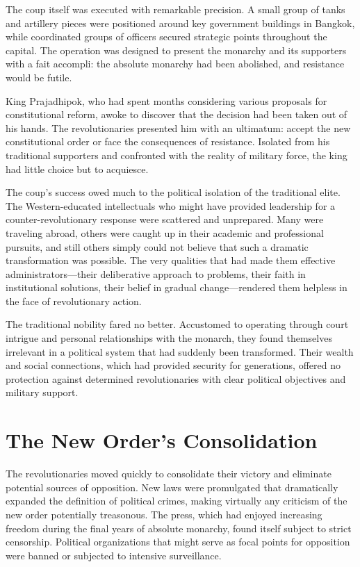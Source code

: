 \documentclass[
  Letterpaper,
]{scrbook}
\begin{document}
The coup itself was executed with remarkable precision. A small group of
tanks and artillery pieces were positioned around key government
buildings in Bangkok, while coordinated groups of officers secured
strategic points throughout the capital. The operation was designed to
present the monarchy and its supporters with a fait accompli: the
absolute monarchy had been abolished, and resistance would be futile.

King Prajadhipok, who had spent months considering various proposals for
constitutional reform, awoke to discover that the decision had been
taken out of his hands. The revolutionaries presented him with an
ultimatum: accept the new constitutional order or face the consequences
of resistance. Isolated from his traditional supporters and confronted
with the reality of military force, the king had little choice but to
acquiesce.

The coup's success owed much to the political isolation of the
traditional elite. The Western-educated intellectuals who might have
provided leadership for a counter-revolutionary response were scattered
and unprepared. Many were traveling abroad, others were caught up in
their academic and professional pursuits, and still others simply could
not believe that such a dramatic transformation was possible. The very
qualities that had made them effective administrators---their
deliberative approach to problems, their faith in institutional
solutions, their belief in gradual change---rendered them helpless in
the face of revolutionary action.

The traditional nobility fared no better. Accustomed to operating
through court intrigue and personal relationships with the monarch, they
found themselves irrelevant in a political system that had suddenly been
transformed. Their wealth and social connections, which had provided
security for generations, offered no protection against determined
revolutionaries with clear political objectives and military support.

\section{The New Order's
Consolidation}\label{the-new-orders-consolidation}

The revolutionaries moved quickly to consolidate their victory and
eliminate potential sources of opposition. New laws were promulgated
that dramatically expanded the definition of political crimes, making
virtually any criticism of the new order potentially treasonous. The
press, which had enjoyed increasing freedom during the final years of
absolute monarchy, found itself subject to strict censorship. Political
organizations that might serve as focal points for opposition were
banned or subjected to intensive surveillance.
\end{document}

